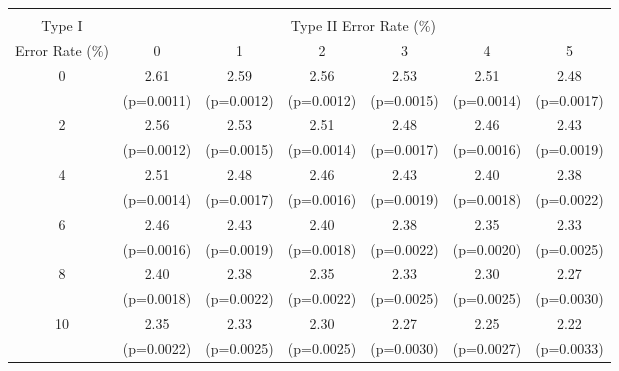 \scriptsize{
\begin{tabular}{c|*{6}{c}}
\hline\hline \\[-8pt]
\rowcolor{yellow!15} Type I & \multicolumn{6}{c}{Type II Error Rate (\%)} \\
\rowcolor{yellow!15} Error Rate (\%)   & 0 & 1 & 2 & 3 & 4 & 5 \\ \hline
0 & 2.61 & 2.59 & 2.56 & 2.53 & 2.51 & 2.48 \\
 & (p=0.0011) & (p=0.0012) & (p=0.0012) & (p=0.0015) & (p=0.0014) & (p=0.0017) \\
[1em]
2 & 2.56 & 2.53 & 2.51 & 2.48 & 2.46 & 2.43 \\
 & (p=0.0012) & (p=0.0015) & (p=0.0014) & (p=0.0017) & (p=0.0016) & (p=0.0019) \\
[1em]
4 & 2.51 & 2.48 & 2.46 & 2.43 & 2.40 & 2.38 \\
 & (p=0.0014) & (p=0.0017) & (p=0.0016) & (p=0.0019) & (p=0.0018) & (p=0.0022) \\
[1em]
6 & 2.46 & 2.43 & 2.40 & 2.38 & 2.35 & 2.33 \\
 & (p=0.0016) & (p=0.0019) & (p=0.0018) & (p=0.0022) & (p=0.0020) & (p=0.0025) \\
[1em]
8 & 2.40 & 2.38 & 2.35 & 2.33 & 2.30 & 2.27 \\
 & (p=0.0018) & (p=0.0022) & (p=0.0022) & (p=0.0025) & (p=0.0025) & (p=0.0030) \\
[1em]
10 & 2.35 & 2.33 & 2.30 & 2.27 & 2.25 & 2.22 \\
 & (p=0.0022) & (p=0.0025) & (p=0.0025) & (p=0.0030) & (p=0.0027) & (p=0.0033) \\
\hline \hline
\end{tabular}
}